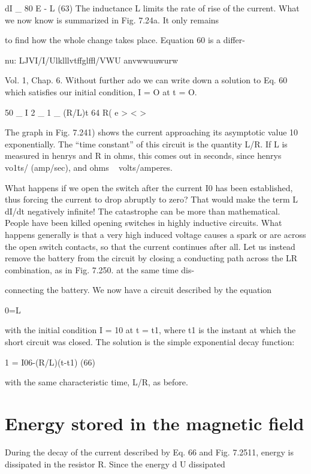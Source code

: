 \begin{equation}
\end{equation}
dI _ 80
E - L (63)
The inductance L limits the rate of rise of the current.
What we now know is summarized in Fig. 7.24a. It only remains

to find how the whole change takes place. Equation 60 is a differ-

nu: LJVI/I/Ulklllvtffglffl/VWU anvwwuuwurw

Vol. 1, Chap. 6. Without further ado we can write down a solution
to Eq. 60 which satisfies our initial condition, I = O at t = O.

\begin{equation}
\end{equation}
50 _
I 2 _ 1 _ (R/L)t 64
R( e > < >

The graph in Fig. 7.241) shows the current approaching its asymptotic
value 10 exponentially. The ``time constant'' of this circuit is
the quantity L/R. If L is measured in henrys and R in ohms, this
comes out in seconds, since henrys ~ vo1ts/ (amp/sec), and
ohms ~ volts/amperes.

What happens if we open the switch after the current I0 has been
established, thus forcing the current to drop abruptly to zero? That
would make the term L dI/dt negatively infinite! The catastrophe
can be more than mathematical. People have been killed opening
switches in highly inductive circuits. What happens generally is that
a very high induced voltage causes a spark or are across the open
switch contacts, so that the current continues after all. Let us instead
remove the battery from the circuit by closing a conducting
path across the LR combination, as in Fig. 7.250. at the same time dis-

connecting the battery. We now have a circuit described by the
equation

\begin{equation}
\end{equation}
0=L%

with the initial condition I = 10 at t = t1, where t1 is the instant at
which the short circuit was closed. The solution is the simple exponential
decay function:

\begin{equation}
\end{equation}
1 = I06-(R/L)(t-t1) (66)

with the same characteristic time, L/R, as before.

\section{Energy stored in the magnetic field}
During the decay of the current described by Eq. 66 and Fig. 7.2511,
energy is dissipated in the resistor R. Since the energy d U dissipated

